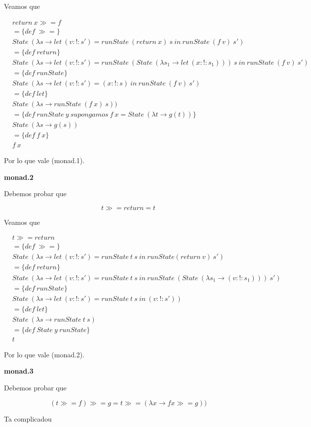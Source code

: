 \documentclass[11pt]{article}
\begin{document}
Veamos que 
\vspace{2mm}

\begin{align*}
    &return\ x \mathrel{\gg \! \! =} f\\
    &= \{def\ \mathrel{\gg \! \! =}\} \\
    &State\ (\lambda s \to let\ (v :\mathrel{!}: s') = runState\ (return\ x)\ s\
                            in\ runState\ (f\ v)\ s') \\
    &= \{def\ return\} \\ 
    &State\ (\lambda s \to let\ (v :\mathrel{!}: s') = runState\ (State\ (\lambda s_1 \to let\ (x :\mathrel{!}: s_1)))\ s\ in\ runState\ (f\ v)\ s') \\
    &= \{def\ runState\} \\
    &State\ (\lambda s \to let\ (v :\mathrel{!}: s') = (x :\mathrel{!}: s)\ in \ runState\ (f\ v)\ s')\\
    &= \{def\ let\} \\
    &State\ (\lambda s \to runState\ (f\ x)\ s)) \\ %
    &= \{def\ runState\ y\ supongamos\ f\ x = State\ (\lambda t \to g(t))\} \\
    &State\ (\lambda s \to g(s))\\
    &= \{def\ f\ x\}\\
    &f\ x
\end{align*}
\vspace{2mm}

Por lo que vale (monad.1).
\vspace{4mm}

\textbf{monad.2}

Debemos probar que

$$t \mathrel{\gg \! \! =} return = t$$

Veamos que 
\vspace{2mm}

\begin{align*}
    &t \mathrel{\gg \! \! =} return\\
    &= \{def\ \mathrel{\gg \! \! =}\} \\
    &State\ (\lambda s \to let\ (v :\mathrel{!}: s') = runState\ t\ s\ in\ runState (return\ v)\ s')\\
    &=\{def\ return\} \\
    &State\ (\lambda s \to let\ (v :\mathrel{!}: s') = runState\ t\ s\ in\ runState\ (State\ (\lambda s_1 \to (v :\mathrel{!}: s_1)))\ s') \\
    &=\{def\ runState\} \\
    &State\ (\lambda s \to let\ (v :\mathrel{!}: s') = runState\ t\ s\ in\ (v :\mathrel{!}: s')) \\
    &= \{def\ let\}\\
    &State\ (\lambda s \to runState\ t\ s) \\
    &= \{def\ State\ y\ runState\}\\
    &t
\end{align*}
\vspace{2mm}

Por lo que vale (monad.2). 
\vspace{4mm}

\textbf{monad.3}

Debemos probar que 

$$(t \mathrel{\gg \! \! =} f) \mathrel{\gg \! \! =} g = t \mathrel{\gg \! \! =} (\lambda x \to f x \mathrel{\gg \! \! =} g))$$

Ta complicadou
\end{document}
